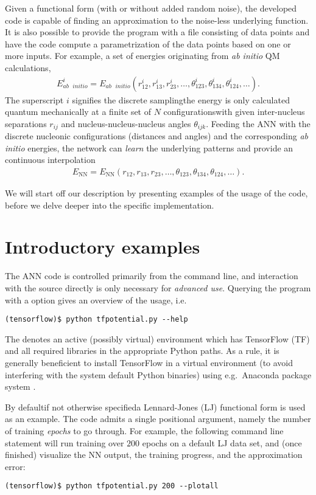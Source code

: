 \documentclass[../../master.tex]{subfiles}
\begin{document}
Given a functional form (with or without added random noise), the developed code is capable of finding an approximation to the noise-less underlying function. It is also possible to provide the program with a file consisting of data points and have the code compute a parametrization of the data points based on one or more inputs. For example, a set of energies originating from \emph{ab initio} QM calculations,
\begin{align}
E_{ab\text{ }initio}^i=E_{ab\text{ }initio}(r^i_{12},r^i_{13},r^i_{23},\dots,\theta^i_{123},\theta^i_{134},\theta^i_{124},\dots).
\end{align}
The superscript $i$ signifies the discrete sampling\textemdash the energy is only calculated quantum mechanically at a finite set of $N$ configurations\textemdash with given inter-nucleus separations $r_{ij}$ and nucleus-nucleus-nucleus angles $\theta_{ijk}$. Feeding the ANN with the discrete nucleonic configurations (distances and angles) and the corresponding \emph{ab initio} energies, the network can \emph{learn} the underlying patterns and provide an continuous interpolation 
\begin{align}
E_\text{NN}=E_\text{NN}(r_{12},r_{13},r_{23},\dots,\theta_{123},\theta_{134},\theta_{124},\dots).
\end{align}

We will start off our description by presenting examples of the usage of the code, before we delve deeper into the specific implementation. 

\section{Introductory examples \label{nnimpintro}}
The ANN code is controlled primarily from the command line, and interaction with the source directly is only necessary for \emph{advanced use}. Querying the program with a  option gives an overview of the usage, i.e.\
\begin{lstlisting}
(tensorflow)$ python tfpotential.py --help
\end{lstlisting}
The  denotes an active (possibly virtual) environment which has TensorFlow (TF) and all required libraries in the appropriate Python paths. As a rule, it is generally beneficient to install TensorFlow in a virtual environment (to avoid interfering with the system default Python binaries) using e.g.\ Anaconda package system \cite{anaconda}. 

By default\textemdash if not otherwise specified\textemdash a Lennard-Jones (LJ) functional form is used as an example. The code admits a single positional argument, namely the number of training \emph{epochs} to go through. For example, the following command line statement will run training over $200$ epochs on a default LJ data set, and (once finished) visualize the NN output, the training progress, and the approximation error:
\begin{lstlisting}
(tensorflow)$ python tfpotential.py 200 --plotall
\end{lstlisting}
\end{document}
